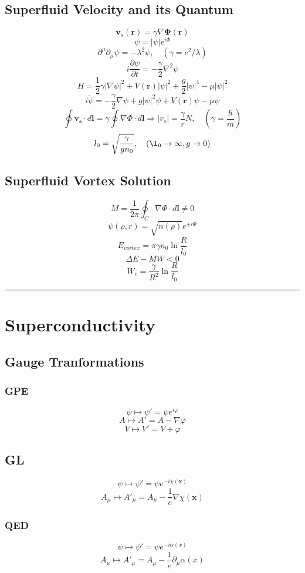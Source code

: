 \documentclass[12pt]{extarticle}
\newcommand{\parentheses}[1]{\ensuremath{\left( #1 \right)}}
\newcommand{\absolutevalue}[1]{\ensuremath{\left| #1 \right|}}
\newcommand{\mysection}[1]{
\vspace{1mm}
\hrule
\section{\Huge{#1}}}
\begin{document}
\begin{multicols*}{2}
\subsection{Superfluid Velocity and its Quantum}
$$\mathbf{v}_s (\mathbf{r}) = \gamma \nabla \mathbf{\Phi (r)}$$
$$\psi = \absolutevalue{\psi} e^{i \Phi}$$
$$\partial^\mu \partial_{\mu} \psi= -\lambda^2 \psi, \quad (\gamma=c^2/\lambda)$$
$$i \dfrac{\partial \psi}{\partial t}= -\dfrac{\gamma}{2} \nabla^2 \psi$$
$$H=\dfrac{1}{2} \gamma \absolutevalue{\nabla \psi}^2 + V(\mathbf{r}) \absolutevalue{\psi}^2 + \dfrac{g}{2}\absolutevalue{\psi}^4 - \mu \absolutevalue{\psi}^2$$
$$i \dot{\psi} = -\dfrac{\gamma}{2} \nabla \psi + g \absolutevalue{\psi}^2 \psi + V(\mathbf{r}) \psi - \mu \psi$$
$$\oint \mathbf{v_s} \cdot d\mathbf{l} = \gamma \oint \nabla \Phi \cdot d\mathbf{l} \Rightarrow \absolutevalue{v_s}=\dfrac{\gamma}{r}N, \quad \parentheses{\gamma=\dfrac{\hbar}{m}}$$
$$l_0=\sqrt{\dfrac{\gamma}{g n_0}}, \quad \parentheses{\l_0 \rightarrow \infty, g \rightarrow 0}$$

\subsection{Superfluid Vortex Solution}
$$M= \dfrac{1}{2\pi} \oint_C \nabla \Phi \cdot d\mathbf{l} \neq 0$$
$$\psi(\rho, r) = \sqrt{n(\rho)} e^{\pm i \Phi}$$
$$E_{vortex}=\pi \gamma n_0 \ln \dfrac{R}{l_0}$$
$$\Delta E - MW < 0$$
$$W_c = \dfrac{\gamma}{R^2} \ln \dfrac{R}{l_0}$$

\mysection{Superconductivity}

\subsection{Gauge Tranformations}
\subsubsection{GPE}
$$\psi \mapsto \psi'=\psi e^{i \varphi}$$
$$A \mapsto A'=A-\nabla \varphi$$
$$V \mapsto V'=V+\varphi$$

\subsection{GL}
$$\psi \mapsto \psi'=\psi e^{-i \chi(\textbf{x})}$$
$$A_\mu \mapsto A'_\mu=A_\mu-\dfrac{1}{e}\nabla \chi(\textbf{x})$$

\subsubsection{QED}
$$\psi \mapsto \psi'=\psi e^{-i \alpha(x)}$$
$$A_\mu \mapsto A'_\mu=A_\mu-\dfrac{1}{e}\partial_\mu \alpha(x)$$


\end{multicols*}
\end{document}
